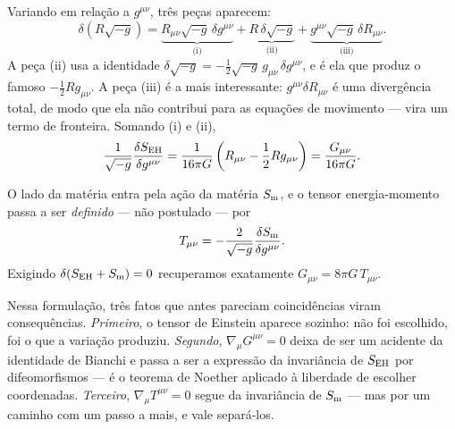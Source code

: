 \documentclass[12pt,a4paper,oneside]{book}
\theoremstyle{rgplain}
\theoremstyle{rgremark}
\begin{document}
Variando em relação a $g^{\mu\nu}$, três peças aparecem:
\[
  \delta\left(R\sqrt{-g}\right)
  =\underbrace{R_{\mu\nu}\sqrt{-g}\,\delta g^{\mu\nu}}_{\text{(i)}}
  +\underbrace{R\,\delta\sqrt{-g}}_{\text{(ii)}}
  +\underbrace{g^{\mu\nu}\sqrt{-g}\,\delta R_{\mu\nu}}_{\text{(iii)}} .
\]
A peça (ii) usa a identidade
$\delta\sqrt{-g}=-\tfrac12\sqrt{-g}\,g_{\mu\nu}\,\delta g^{\mu\nu}$, e é ela
que produz o famoso $-\tfrac12 Rg_{\mu\nu}$. A peça (iii) é a mais
interessante: $g^{\mu\nu}\delta R_{\mu\nu}$ é uma divergência total, de modo
que ela não contribui para as equações de movimento --- vira um termo de
fronteira. Somando (i) e (ii),
\[
  \frac{1}{\sqrt{-g}}\frac{\delta S_{\rm EH}}{\delta g^{\mu\nu}}
  =\frac{1}{16\pi G}\left(R_{\mu\nu}-\frac12 Rg_{\mu\nu}\right)
  =\frac{G_{\mu\nu}}{16\pi G}.
\]

O lado da matéria entra pela ação da matéria $S_{\rm m}$, e o tensor
energia-momento passa a ser \emph{definido} --- não postulado --- por
\begin{equation}
  T_{\mu\nu}=-\frac{2}{\sqrt{-g}}\frac{\delta S_{\rm m}}{\delta g^{\mu\nu}}.
  \label{eq:T-variacional}
\end{equation}
Exigindo $\delta(S_{\rm EH}+S_{\rm m})=0$ recuperamos exatamente
$G_{\mu\nu}=8\pi G\,T_{\mu\nu}$.

\begin{central}
Nessa formulação, três fatos que antes pareciam coincidências viram
consequências. \emph{Primeiro}, o tensor de Einstein aparece sozinho: não foi
escolhido, foi o que a variação produziu. \emph{Segundo},
$\nabla_\mu G^{\mu\nu}=0$ deixa de ser um acidente da identidade de Bianchi e
passa a ser a expressão da invariância de $S_{\rm EH}$ por difeomorfismos ---
é o teorema de Noether aplicado à liberdade de escolher coordenadas.
\emph{Terceiro}, $\nabla_\mu T^{\mu\nu}=0$ segue da invariância de
$S_{\rm m}$ --- mas por um caminho com um passo a mais, e vale separá-los.
\end{central}
\end{document}
